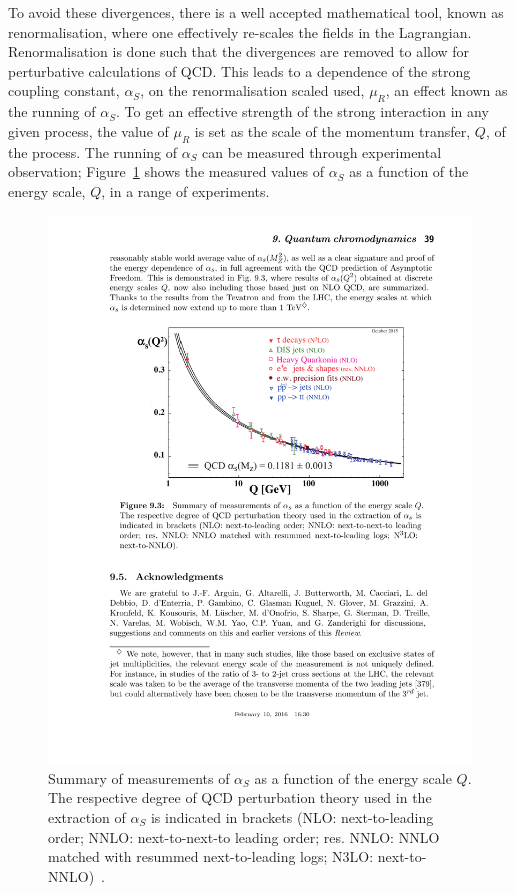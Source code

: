 To avoid these divergences, there is a well accepted mathematical tool, known as renormalisation,
where one effectively re-scales the fields in the Lagrangian.
Renormalisation is done such that the divergences are removed
to allow for perturbative calculations of QCD.
This leads to a dependence of the strong coupling constant, $\alpha_S$, on the renormalisation scaled used, $\mu_R$,
an effect known as the running of $\alpha_S$.
To get an effective strength of the strong interaction in any given process,
the value of $\mu_R$ is set as the scale of the momentum transfer, $Q$, of the process.
The running of $\alpha_{S}$ can be measured through experimental observation;
Figure~\ref{fig:theo-qcd_running} shows the measured values of $\alpha_S$
as a function of the energy scale, $Q$, in a range of experiments.

\begin{figure}[!hbt]
  \begin{center}
    \includegraphics[width=0.7\linewidth, angle=0]{figs/Theory/qcd_running.pdf}
  \end{center}
  \caption[Summary of measurements of $\alpha_S$ as a function of the energy scale $Q$.]
          {Summary of measurements of $\alpha_S$ as a function of the energy scale $Q$.
            The respective degree of QCD perturbation theory used in the extraction of $\alpha_S$ is indicated in brackets
            (NLO: next-to-leading order; NNLO: next-to-next-to leading order; res. NNLO: NNLO matched with resummed next-to-leading logs; N3LO: next-to-NNLO)~\cite{theo-qcd}.}
  \label{fig:theo-qcd_running}
\end{figure}

